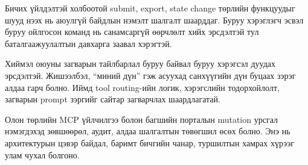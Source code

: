 Бичих үйлдэлтэй холбоотой submit, export, state change төрлийн функцуудыг шууд нээх нь аюулгүй байдлын нэмэлт шалгалт шаарддаг. Буруу хэрэглэгч эсвэл буруу ойлгосон команд нь санамсаргүй өөрчлөлт хийх эрсдэлтэй тул баталгаажуулалтын давхарга заавал хэрэгтэй.

Хиймэл оюуны загварын тайлбарлал буруу байвал буруу хэрэгсэл дуудах эрсдэлтэй. Жишээлбэл, ``миний дүн'' гэж асуухад санхүүгийн дүн буцаах зэрэг алдаа гарч болно. Иймд tool routing-ийн логик, хэрэгслийн тодорхойлолт, загварын prompt зэргийг сайтар загварчлах шаардлагатай.

Олон төрлийн MCP үйлчилгээ болон багшийн порталын mutation урсгал нэмэгдэхэд зөвшөөрөл, аудит, алдаа шалгалтын төвөгшил өсөх болно. Энэ нь архитектурын цэвэр байдал, баримт бичгийн чанар, туршилтын хамрах хүрээг улам чухал болгоно.
